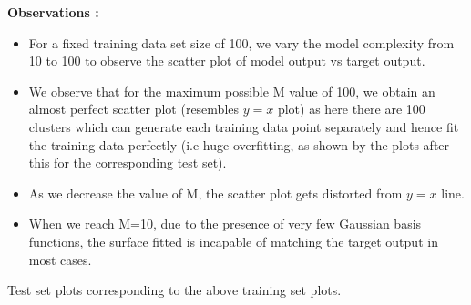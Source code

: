 \documentclass{article}
\begin{document}
\textbf{Observations : \newline}
\begin{itemize}
\item For a fixed training data set size of 100, we vary the model complexity from 10 to 100 to observe the scatter plot of model output vs target output.
\item We observe that for the maximum possible M value of 100, we obtain an almost perfect scatter plot (resembles $y=x$ plot) as here there are 100 clusters which can generate each training data point separately and hence fit the training data perfectly (i.e huge overfitting, as shown by the plots after this for the corresponding test set).
\item As we decrease the value of M, the scatter plot gets distorted from $y=x$ line.
\item When we reach M=10, due to the presence of very few Gaussian basis functions, the surface fitted is incapable of matching the target output in most cases.
\end{itemize}
\newpage
Test set plots corresponding to the above training set plots.
\end{document}
